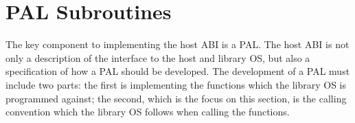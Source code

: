 


%
%
%



\section{PAL Subroutines}



The key component to implementing the host ABI
is a PAL.
The host ABI
is not only a description of the interface to the host and library OS,
but also a specification of how a PAL should be developed.
The development of a PAL
must include two parts: the first is implementing the functions which the library OS is programmed against;
the second, which is the focus on this section,
is the calling convention
which the library OS follows when calling the functions.



